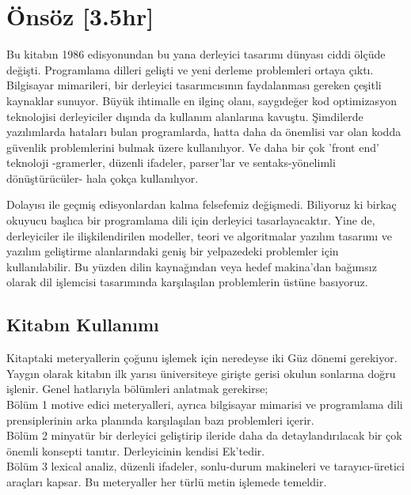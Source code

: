 \pagestyle{myheadings}

\chapter*{Önsöz [3.5hr]}
Bu kitabın 1986 edisyonundan bu yana derleyici tasarımı dünyası ciddi ölçüde değişti. Programlama dilleri gelişti ve yeni derleme problemleri ortaya çıktı. Bilgisayar mimarileri, bir derleyici tasarımcısının faydalanması gereken çeşitli kaynaklar sunuyor. Büyük ihtimalle en ilginç olanı, saygıdeğer kod optimizasyon teknolojisi derleyiciler dışında da kullanım alanlarına kavuştu. Şimdilerde yazılımlarda hataları bulan programlarda, hatta daha da önemlisi var olan kodda güvenlik problemlerini bulmak üzere kullanılıyor. Ve daha bir çok 'front end' teknoloji -gramerler, düzenli ifadeler, parser'lar ve sentaks-yönelimli dönüştürücüler- hala çokça kullanılıyor.

Dolayısı ile geçmiş edisyonlardan kalma felsefemiz değişmedi. Biliyoruz ki birkaç okuyucu başlıca bir programlama dili için derleyici tasarlayacaktır. Yine de, derleyiciler ile ilişkilendirilen modeller, teori ve algoritmalar yazılım tasarımı ve yazılım geliştirme alanlarındaki geniş bir yelpazedeki problemler için kullanılabilir. Bu yüzden dilin kaynağından veya hedef makina'dan bağımsız olarak dil işlemcisi tasarımında karşılaşılan problemlerin üstüne basıyoruz.

\section*{Kitabın Kullanımı}

Kitaptaki meteryallerin çoğunu işlemek için neredeyse iki Güz dönemi gerekiyor. Yaygın olarak kitabın ilk yarısı üniversiteye girişte gerisi okulun sonlarına doğru işlenir. Genel hatlarıyla bölümleri anlatmak gerekirse;
\\

Bölüm 1 motive edici meteryalleri, ayrıca bilgisayar mimarisi ve programlama dili prensiplerinin arka planında karşılaşılan bazı problemleri içerir.
\\

Bölüm 2 minyatür bir derleyici geliştirip ileride daha da detaylandırılacak bir çok önemli konsepti tanıtır. Derleyicinin kendisi Ek'tedir.
\\

Bölüm 3 lexical analiz, düzenli ifadeler, sonlu-durum makineleri ve tarayıcı-üretici araçları kapsar. Bu meteryaller her türlü metin işlemede temeldir.
\\

